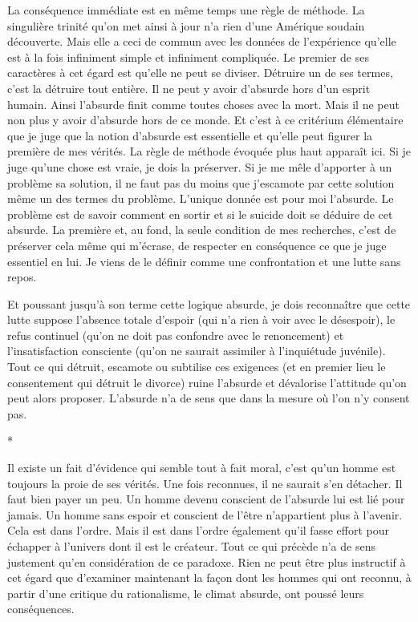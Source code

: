 \documentclass{book}
\begin{document}
La conséquence immédiate est en même temps une règle de méthode. La singulière trinité qu'on met ainsi à jour n'a rien d'une Amérique soudain découverte. Mais elle a ceci de commun avec les données de l'expérience qu'elle est à la fois infiniment simple et infiniment compliquée. Le premier de ses caractères à cet égard est qu'elle ne peut se diviser. Détruire un de ses termes, c'est la détruire tout entière. Il ne peut y avoir d'absurde hors d'un esprit humain. Ainsi l'absurde finit comme toutes choses avec la mort. Mais il ne peut non plus y avoir d'absurde hors de ce monde. Et c'est à ce critérium élémentaire que je juge que la notion d'absurde est essentielle et qu'elle peut figurer la première de mes vérités. La règle de méthode évoquée plus haut apparaît ici. Si je juge qu'une chose est vraie, je dois la préserver. Si je me mêle d'apporter à un problème sa solution, il ne faut pas du moins que j'escamote par cette solution même un des termes du problème. L'unique donnée est pour moi l'absurde. Le problème est de savoir comment en sortir et si le suicide doit se déduire de cet absurde. La première et, au fond, la seule condition de mes recherches, c'est de préserver cela même qui m'écrase, de respecter en conséquence ce que je juge essentiel en lui. Je viens de le définir comme une confrontation et une lutte sans repos.

Et poussant jusqu'à son terme cette logique absurde, je dois reconnaître que cette lutte suppose l'absence totale d'espoir (qui n'a rien à voir avec le désespoir), le refus continuel (qu'on ne doit pas confondre avec le renoncement) et l'insatisfaction consciente (qu'on ne saurait assimiler à l'inquiétude juvénile). Tout ce qui détruit, escamote ou subtilise ces exigences (et en premier lieu le consentement qui détruit le divorce) ruine l'absurde et dévalorise l'attitude qu'on peut alors proposer. L'absurde n'a de sens que dans la mesure où l'on n'y consent pas.

\begin{center}
*
\end{center}

Il existe un fait d'évidence qui semble tout à fait moral, c'est qu'un homme est toujours la proie de ses vérités. Une fois reconnues, il ne saurait s'en détacher. Il faut bien payer un peu. Un homme devenu conscient de l'absurde lui est lié pour jamais. Un homme sans espoir et conscient de l'être n'appartient plus à l'avenir. Cela est dans l'ordre. Mais il est dans l'ordre également qu'il fasse effort pour échapper à l'univers dont il est le créateur. Tout ce qui précède n'a de sens justement qu'en considération de ce paradoxe. Rien ne peut être plus instructif à cet égard que d'examiner maintenant la façon dont les hommes qui ont reconnu, à partir d'une critique du rationalisme, le climat absurde, ont poussé leurs conséquences.
\end{document}
